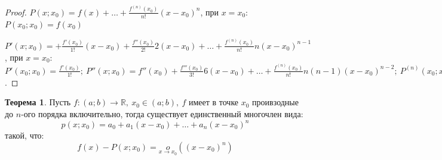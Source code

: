 \documentclass{report}
\theoremstyle{definition}
\newtheorem{theorem}{Теорема}[section]
\begin{document}
\begin{proof}
  $P(x;x_0) = f(x) + \ldots + \frac{f^{(n)}(x_0)}{n!}(x-x_0)^n$, при $x = x_0$: $P(x_0;x_0) = f(x_0)$

  $P'(x;x_0) = + \frac{f'(x_0)}{1!}(x-x_0) + \frac{f''(x_0)}{2!}2(x-x_0) + \ldots
    + \frac{f^{(n)}(x_0)}{n!}n(x-x_0)^{n-1}$, при $x = x_0$: $P'(x_0;x_0) = \frac{f'(x_0)}{1!}; \
    P''(x;x_0) = f''(x_0) + \frac{f'''(x_0)}{3!}6(x-x_0) + \ldots + \frac{f^{(n)}(x_0)}{n!}
    n(n-1)(x-x_0)^{n-2}; \ P^{(n)}(x_0;x_0) = f^{(n)}(x_0)$.
\end{proof}

\begin{theorem}
  Пусть $f:(a;b)\rightarrow\mathbb{R}, \ x_0\in(a;b), \ f$ имеет в точке $x_0$ проивзодные до $n$-ого
  порядка включительно, тогда существует единственный многочлен вида:
  \begin{equation*}
    p(x;x_0) = a_0 + a_1(x-x_0) + \ldots + a_n(x-x_0)^n
  \end{equation*}
  такой, что:
  \begin{equation*}
    f(x) - P(x;x_0) = \underset{x\rightarrow x_0}{o}((x-x_0)^n)
  \end{equation*}
\end{theorem}
\end{document}
